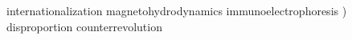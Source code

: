 \documentclass{memoir}
\begin{document}
\noindent internationalization magnetohydrodynamics immunoelectrophoresis ) disproportion counterrevolution
\end{document}
